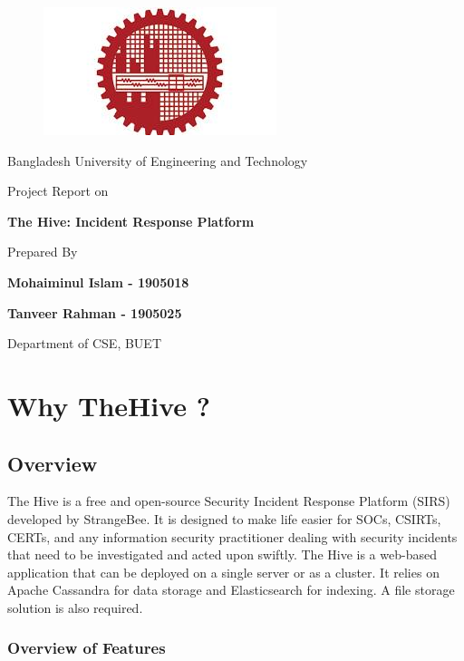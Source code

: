\documentclass{book}
\begin{document}
\begin{titlepage}
\begin{figure}[h]
    \centering
    \includegraphics {buet logo.jpeg}
\end{figure}
  \centering
  {\LARGE Bangladesh University of Engineering and Technology \par}
  
  \vspace{3cm}
  {\large Project Report on\par}
  {\fontsize{24pt}{28pt}\bfseries The Hive: Incident Response Platform \par}
  \vspace{2cm}
  {\large Prepared By\par}
  {\LARGE \textbf{Mohaiminul Islam - 1905018} \par}
  {\LARGE \textbf{Tanveer Rahman - 1905025} \par}
  \vspace{4cm}
  {\LARGE Department of CSE, BUET \par}
  \vfill
\end{titlepage}


\tableofcontents

\chapter{Why TheHive ?}
\section{Overview}
The Hive is a free and open-source Security Incident Response Platform (SIRS) developed by StrangeBee. It is designed to make life easier for SOCs, CSIRTs, CERTs, and any information security practitioner dealing with security incidents that need to be investigated and acted upon swiftly. The Hive is a web-based application that can be deployed on a single server or as a cluster. It relies on Apache Cassandra for data storage and Elasticsearch for indexing. A file storage solution is also required.

\subsection{Overview of Features}
\end{document}
